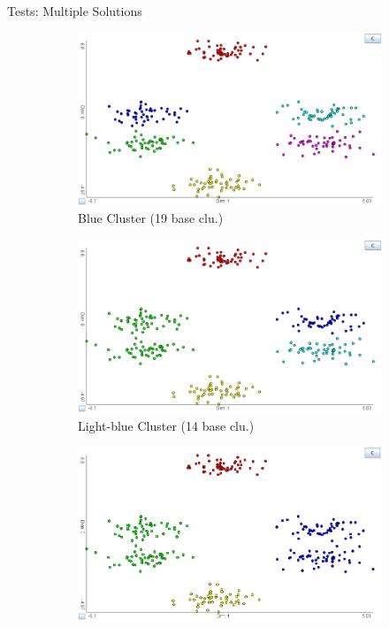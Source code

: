 \documentclass[aspectratio=169]{beamer}
\begin{document}
\begin{frame}{Tests: Multiple Solutions}
	\begin{figure}[h]
	\centering
	\begin{subfigure}[t]{.35\textwidth}
		  \centering
		  \includegraphics[width=.99\linewidth]{multi_c6}
		  \caption{Blue Cluster (19 base clu.)}
		  \label{fig:multi_c6}
	\end{subfigure}
	\begin{subfigure}[t]{.35\textwidth}
		  \centering
		  \includegraphics[width=.99\linewidth]{multi_c5_2}
		  \caption{Light-blue Cluster (14 base clu.)}
		  \label{fig:multi_c5_2}
	\end{subfigure}
	\begin{subfigure}[t]{.35\textwidth}
		  \centering
		  \includegraphics[width=.99\linewidth]{multi_c4}

\end{subfigure}
\end{figure}
\end{frame}
\end{document}
